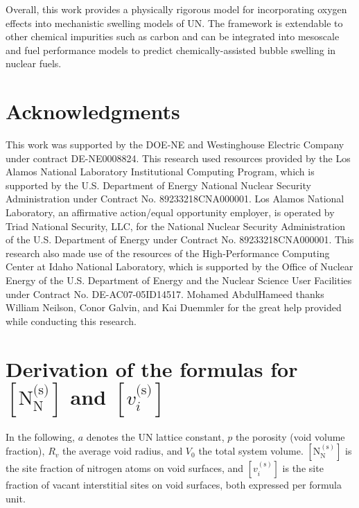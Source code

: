 \documentclass[preprint,12pt,sort&compress]{elsarticle}
\newcommand{\?}{\stackrel{?}{=}}
\providecommand{\DIFaddbegin}{\protect\color{blue}} %
\providecommand{\DIFaddend}{\protect\color{black}} %
\begin{document}
Overall, this work provides a physically rigorous model for incorporating oxygen effects into mechanistic swelling models of UN. The framework is extendable to other chemical impurities such as carbon and can be integrated into mesoscale and fuel performance models to predict chemically-assisted bubble swelling in nuclear fuels.

\section{Acknowledgments}

This work was supported by the DOE-NE and Westinghouse Electric Company under contract DE-NE0008824. This research used resources provided by the Los Alamos National Laboratory Institutional Computing Program, which is supported by the U.S. Department of Energy National Nuclear Security Administration under Contract No. 89233218CNA000001. Los Alamos National Laboratory, an affirmative action/equal opportunity employer, is operated by Triad National Security, LLC, for the National Nuclear Security Administration of the U.S. Department of Energy under Contract No. 89233218CNA000001. This research also made use of the resources of the High-Performance Computing Center at Idaho National Laboratory, which is supported by the Office of Nuclear Energy of the U.S. Department of Energy and the Nuclear Science User Facilities under Contract No. DE-AC07-05ID14517. Mohamed AbdulHameed thanks William Neilson, Conor Galvin, and Kai Duemmler for the great help provided while conducting this research.

\DIFaddbegin \FloatBarrier
\newpage

\DIFaddend \appendix

\section{Derivation of the formulas for $[ \text{N}_\text{N}^\text{(s)} ]$ and $[ v_i^\text{(s)} ]$}
\label{App1}

In the following, $a$ denotes the UN lattice constant, $p$ the porosity (void volume fraction), $R_v$ the average void radius, and $V_0$ the total system volume. $[\text{N}_\text{N}^{(\text{s})}]$ is the site fraction of nitrogen atoms on void surfaces, and $[v_i^{(\text{s})}]$ is the site fraction of vacant interstitial sites on void surfaces, both expressed per formula unit.
\end{document}
